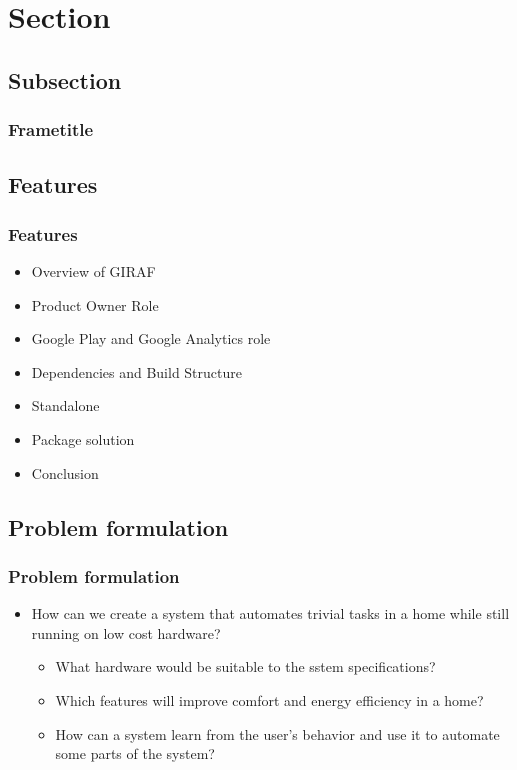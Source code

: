 \section{Section}
\subsection{Subsection}
\begin{frame}
	\frametitle{Frametitle}	
\end{frame}

\subsection{Features}

\begin{frame}
  \begin{center}
    \frametitle{Features}
    	\begin{itemize}
			\item Overview of GIRAF
			\item Product Owner Role
			\item Google Play and Google Analytics role
			\item Dependencies and Build Structure
			\item Standalone
			\item Package solution
			\item Conclusion
		\end{itemize}			
  \end{center}
\end{frame}

\subsection{Problem formulation}

\begin{frame}
  \begin{center}
    \frametitle{Problem formulation}
    	\begin{itemize}
    		\item How can we create a system that automates trivial tasks in a home while still running on low cost hardware?
    			\begin{itemize}
    				\item What hardware would be suitable to the sstem specifications?
    				\item Which features will improve comfort and energy efficiency in a home?
    				\item How can a system learn from the user's behavior and use it to automate some parts of the system?
    			\end{itemize}
    	\end{itemize}
  \end{center}
\end{frame}